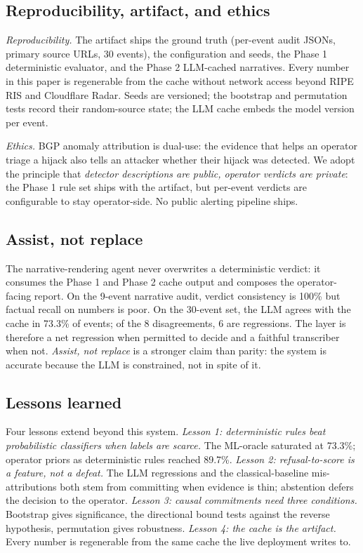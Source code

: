 \subsection{Reproducibility, artifact, and ethics}

\textit{Reproducibility.} The artifact ships the ground truth (per-event audit JSONs, primary source URLs, 30 events), the configuration and seeds, the Phase 1 deterministic evaluator, and the Phase 2 LLM-cached narratives. Every number in this paper is regenerable from the cache without network access beyond RIPE RIS and Cloudflare Radar. Seeds are versioned; the bootstrap and permutation tests record their random-source state; the LLM cache embeds the model version per event.

\textit{Ethics.} BGP anomaly attribution is dual-use: the evidence that helps an operator triage a hijack also tells an attacker whether their hijack was detected. We adopt the principle that \emph{detector descriptions are public, operator verdicts are private}: the Phase 1 rule set ships with the artifact, but per-event verdicts are configurable to stay operator-side. No public alerting pipeline ships.

\subsection{Assist, not replace}

The narrative-rendering agent never overwrites a deterministic verdict: it consumes the Phase 1 and Phase 2 cache output and composes the operator-facing report. On the 9-event narrative audit, verdict consistency is 100\% but factual recall on numbers is poor. On the 30-event set, the LLM agrees with the cache in 73.3\% of events; of the 8 disagreements, 6 are regressions. The layer is therefore a net regression when permitted to decide and a faithful transcriber when not. \emph{Assist, not replace} is a stronger claim than parity: the system is accurate because the LLM is constrained, not in spite of it.

\subsection{Lessons learned}

Four lessons extend beyond this system. \emph{Lesson 1: deterministic rules beat probabilistic classifiers when labels are scarce.} The ML-oracle saturated at 73.3\%; operator priors as deterministic rules reached 89.7\%. \emph{Lesson 2: refusal-to-score is a feature, not a defeat.} The LLM regressions and the classical-baseline mis-attributions both stem from committing when evidence is thin; abstention defers the decision to the operator. \emph{Lesson 3: causal commitments need three conditions.} Bootstrap gives significance, the directional bound tests against the reverse hypothesis, permutation gives robustness. \emph{Lesson 4: the cache is the artifact.} Every number is regenerable from the same cache the live deployment writes to.

